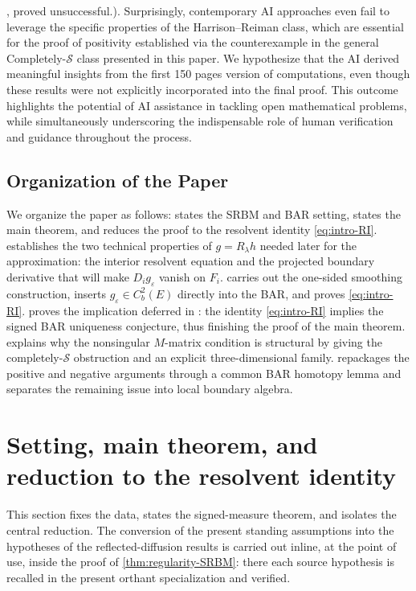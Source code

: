 \documentclass[aihp]{imsart}
\numberwithin{equation}{section}
\theoremstyle{plain}
\theoremstyle{definition}
\newcommand{\1}{\mathbf 1}
\begin{document}
\cite{LipshutzRamanan2018, LipshutzRamanan2019}, proved unsuccessful.). Surprisingly, contemporary AI approaches even fail to leverage the specific properties of the Harrison–Reiman class, which are essential for the proof of positivity established via the counterexample in the general Completely-$\mathcal{S}$ class presented in this paper. We hypothesize that the AI derived meaningful insights from the first 150 pages version of computations, even though these results were not explicitly incorporated into the final proof. This outcome highlights the potential of AI assistance in tackling open mathematical problems, while simultaneously underscoring the indispensable role of human verification and guidance throughout the process.
\subsection*{Organization of the Paper} 
We organize the paper as follows:  states the SRBM and BAR setting, states the main theorem, and reduces the proof to the
resolvent identity \eqref{eq:intro-RI}.  
establishes the two technical properties of $g=R_\lambda h$ needed later for the approximation:
the interior resolvent equation and the projected boundary derivative that will
make $D_i g_\varepsilon$ vanish on $F_i$.   carries out the
one-sided smoothing construction, inserts $g_\varepsilon\in C_b^2(E)$ directly
into the BAR, and proves \eqref{eq:intro-RI}.  
proves the implication deferred in : the identity \eqref{eq:intro-RI} implies the signed BAR uniqueness conjecture, thus finishing the proof of the main theorem.   explains why the nonsingular $M$-matrix condition
is structural by giving the completely-$\mathcal{S}$ obstruction and an explicit
three-dimensional family.   repackages the positive and negative arguments through a common BAR homotopy lemma and separates the remaining issue into local boundary algebra.

\section{Setting, main theorem, and reduction to the resolvent identity}\label{sec:setting}

This section fixes the data, states the signed-measure theorem, and isolates the central reduction. The conversion of the present standing assumptions into the hypotheses of the reflected-diffusion results is carried out inline, at the point of use, inside the proof of \cref{thm:regularity-SRBM}: there each source hypothesis is recalled in the present orthant specialization and verified.
\end{document}
